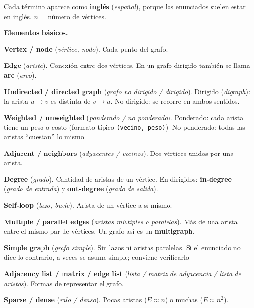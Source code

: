 Cada término aparece como \textbf{inglés} (\textit{español}), porque los enunciados suelen estar en inglés. \(n\) = número de vértices.

\textbf{Elementos básicos.}
\begin{props}
  \item \textbf{Vertex / node} (\textit{vértice, nodo}). Cada punto del grafo.
  \item \textbf{Edge} (\textit{arista}). Conexión entre dos vértices. En un grafo dirigido también se llama \textbf{arc} (\textit{arco}).
  \item \textbf{Undirected / directed graph} (\textit{grafo no dirigido / dirigido}). Dirigido (\textit{digraph}): la arista \(u \to v\) es distinta de \(v \to u\). No dirigido: se recorre en ambos sentidos.
  \item \textbf{Weighted / unweighted} (\textit{ponderado / no ponderado}). Ponderado: cada arista tiene un peso o costo (formato típico \texttt{(vecino, peso)}). No ponderado: todas las aristas ``cuestan'' lo mismo.
  \item \textbf{Adjacent / neighbors} (\textit{adyacentes / vecinos}). Dos vértices unidos por una arista.
  \item \textbf{Degree} (\textit{grado}). Cantidad de aristas de un vértice. En dirigidos: \textbf{in-degree} (\textit{grado de entrada}) y \textbf{out-degree} (\textit{grado de salida}).
  \item \textbf{Self-loop} (\textit{lazo, bucle}). Arista de un vértice a sí mismo.
  \item \textbf{Multiple / parallel edges} (\textit{aristas múltiples o paralelas}). Más de una arista entre el mismo par de vértices. Un grafo así es un \textbf{multigraph}.
  \item \textbf{Simple graph} (\textit{grafo simple}). Sin lazos ni aristas paralelas. Si el enunciado no dice lo contrario, a veces se asume simple; conviene verificarlo.
  \item \textbf{Adjacency list / matrix / edge list} (\textit{lista / matriz de adyacencia / lista de aristas}). Formas de representar el grafo.
  \item \textbf{Sparse / dense} (\textit{ralo / denso}). Pocas aristas (\(E \approx n\)) o muchas (\(E \approx n^2\)).
\end{props}

